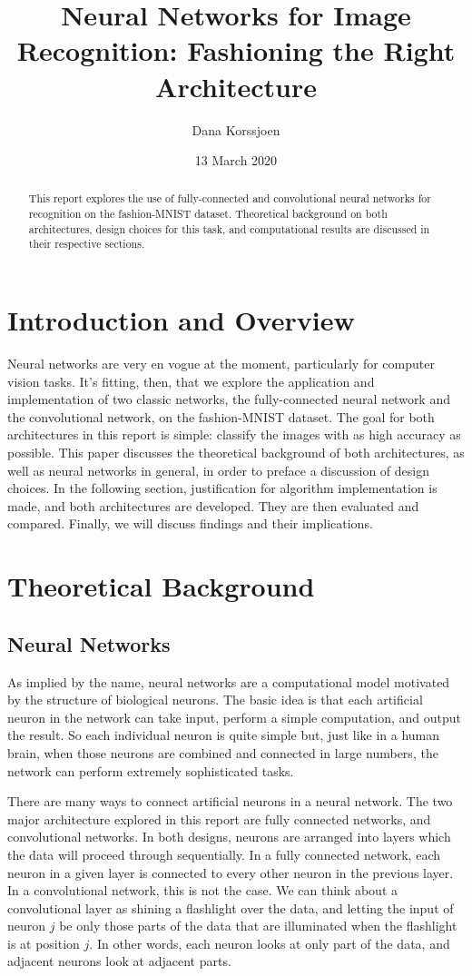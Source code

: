 \documentclass[a4paper,10 pt]{article}
\title{Neural Networks for Image Recognition: Fashioning the Right Architecture}
\author{Dana Korssjoen}
\date{13 March 2020}
\begin{document}
\maketitle
\begin{abstract}
    This report explores the use of fully-connected and convolutional neural networks for recognition on the fashion-MNIST dataset. Theoretical background on both architectures, design choices for this task, and computational results are discussed in their respective sections.
\end{abstract}
\section{Introduction and Overview}
Neural networks are very en vogue at the moment, particularly for computer vision tasks. It's fitting, then, that we explore the application and implementation of two classic networks, the fully-connected neural network and the convolutional network, on the fashion-MNIST dataset. The goal for both architectures in this report is simple: classify the images with as high accuracy as possible. This paper discusses the theoretical background of both architectures, as well as neural networks in general, in order to preface a discussion of design choices. In the following section, justification for algorithm implementation is made, and both architectures are developed. They are then evaluated and compared. Finally, we will discuss findings and their implications.

\section{Theoretical Background}
\subsection{Neural Networks}
As implied by the name, neural networks are a computational model motivated by the structure of biological neurons. The basic idea is that each artificial neuron in the network can take input, perform a simple computation, and output the result. So each individual neuron is quite simple but, just like in a human brain, when those neurons are combined and connected in large numbers, the network can perform extremely sophisticated tasks. 

There are many ways to connect artificial neurons in a neural network. The two major architecture explored in this report are fully connected networks, and convolutional networks. In both designs, neurons are arranged into layers which the data will proceed through sequentially. In a fully connected network, each neuron in a given layer is connected to every other neuron in the previous layer. In a convolutional network, this is not the case. We can think about a convolutional layer as shining a flashlight over the data, and letting the input of neuron $j$ be only those parts of the data that are illuminated when the flashlight is at position $j$. In other words, each neuron looks at only part of the data, and adjacent neurons look at adjacent parts.
\end{document}
